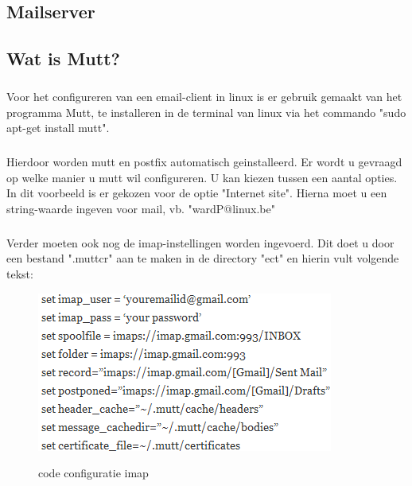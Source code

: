 \documentclass[12pt,a4paper]{report}
\begin{document}
\begin{flushleft}
\chapter{Mailserver}
\section{Wat is Mutt?}
\paragraph*{}
Voor het configureren van een email-client in linux is er gebruik gemaakt van het programma Mutt, te installeren in de terminal van linux via het commando "sudo apt-get install mutt".
\paragraph*{}
Hierdoor worden mutt en postfix automatisch geinstalleerd. Er wordt u gevraagd op welke manier u mutt wil configureren. U kan kiezen tussen een aantal opties. In dit voorbeeld is er gekozen voor de optie "Internet site". Hierna moet u een string-waarde ingeven voor mail, vb. "wardP@linux.be"
\paragraph*{}
Verder moeten ook nog de imap-instellingen worden ingevoerd. Dit doet u door een bestand ".muttcr" aan te maken in de directory "ect" en hierin vult volgende tekst:
\begin{figure}[H]
\includegraphics[scale=0.75]{images/imap_01.png}
\label{imap_01}
\centering 
\vspace{-10pt}
\caption{code configuratie imap}
\end{figure}  
\pagebreak

\end{flushleft}
\end{document}
